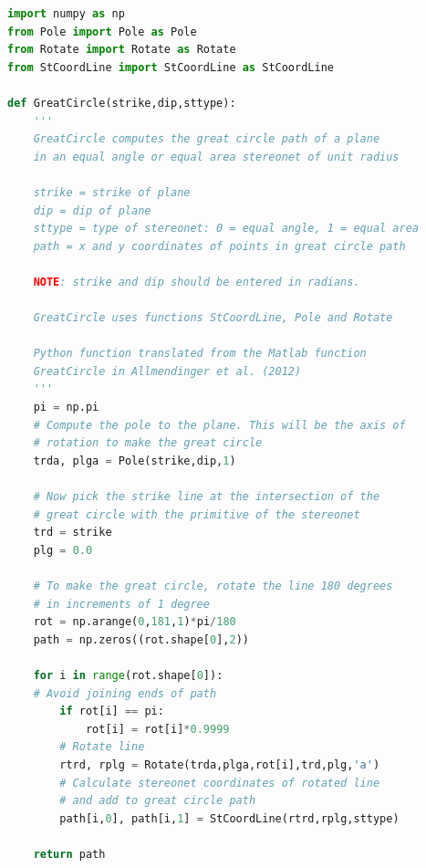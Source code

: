 \documentclass[a4paper , 12pt]{book}
\begin{document}
\begin{lstlisting}[language=Python, frame=single]
import numpy as np
from Pole import Pole as Pole
from Rotate import Rotate as Rotate
from StCoordLine import StCoordLine as StCoordLine

def GreatCircle(strike,dip,sttype):
    '''
	GreatCircle computes the great circle path of a plane 
	in an equal angle or equal area stereonet of unit radius
	
	strike = strike of plane
	dip = dip of plane
	sttype = type of stereonet: 0 = equal angle, 1 = equal area
	path = x and y coordinates of points in great circle path
	
	NOTE: strike and dip should be entered in radians. 
	
	GreatCircle uses functions StCoordLine, Pole and Rotate
	
	Python function translated from the Matlab function
	GreatCircle in Allmendinger et al. (2012)
	'''
    pi = np.pi
	# Compute the pole to the plane. This will be the axis of 
	# rotation to make the great circle
    trda, plga = Pole(strike,dip,1)
    
	# Now pick the strike line at the intersection of the 
    # great circle with the primitive of the stereonet
    trd = strike
    plg = 0.0
    
	# To make the great circle, rotate the line 180 degrees 
	# in increments of 1 degree
    rot = np.arange(0,181,1)*pi/180
    path = np.zeros((rot.shape[0],2))
    
    for i in range(rot.shape[0]):
	# Avoid joining ends of path
        if rot[i] == pi:
            rot[i] = rot[i]*0.9999
		# Rotate line
        rtrd, rplg = Rotate(trda,plga,rot[i],trd,plg,'a')
		# Calculate stereonet coordinates of rotated line 
		# and add to great circle path
        path[i,0], path[i,1] = StCoordLine(rtrd,rplg,sttype)
    
    return path
\end{lstlisting}
\end{document}

